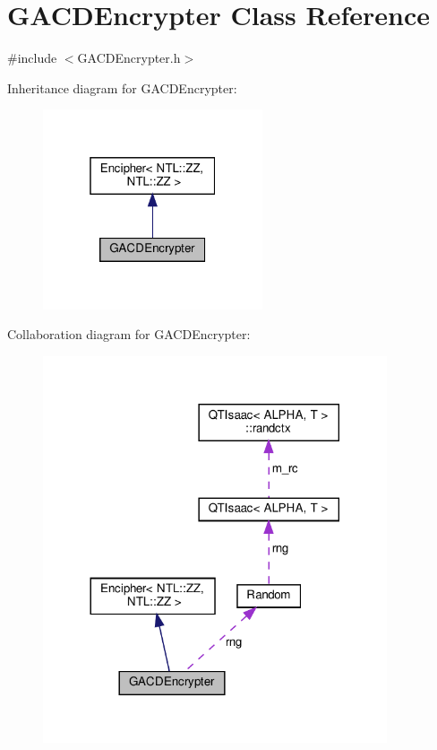 \hypertarget{classGACDEncrypter}{}\section{G\+A\+C\+D\+Encrypter Class Reference}
\label{classGACDEncrypter}


{\ttfamily \#include $<$G\+A\+C\+D\+Encrypter.\+h$>$}



Inheritance diagram for G\+A\+C\+D\+Encrypter\+:
\nopagebreak
\begin{figure}[H]
\begin{center}
\leavevmode
\includegraphics[width=184pt]{classGACDEncrypter__inherit__graph}
\end{center}
\end{figure}


Collaboration diagram for G\+A\+C\+D\+Encrypter\+:
\nopagebreak
\begin{figure}[H]
\begin{center}
\leavevmode
\includegraphics[width=288pt]{classGACDEncrypter__coll__graph}
\end{center}
\end{figure}
